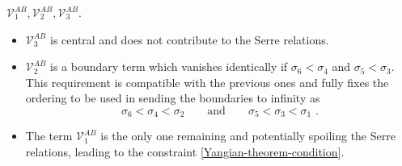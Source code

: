\documentclass[12pt]{article}
\numberwithin{equation}{section}
\begin{document}
\begin{itemize}
\begin{itemize}
$\mathcal{V}_{1}^{AB},\mathcal{V}_{2}^{AB},\mathcal{V}_{3}^{AB}$.
\begin{itemize}
\item $\mathcal{V}_{3}^{AB}$ is central and does not contribute to the Serre relations.
\item $\mathcal{V}_{2}^{AB}$ is a boundary term which vanishes identically if $\sigma_{6}<\sigma_{4}$ and $\sigma_{5}<\sigma_{3}$. This requirement is compatible with the previous ones and fully fixes the ordering to be used in sending the boundaries to infinity as
\begin{equation}
\sigma_{6} <\sigma_{4}<\sigma_{2}
\qquad \text{and} \qquad 
\sigma_{5} <\sigma_{3}<\sigma_{1} \,\, .
\end{equation}
\item The term $\mathcal{V}_{1}^{AB}$ is the only one remaining and potentially spoiling the Serre relations, leading to the constraint \eqref{Yangian-theorem-condition}.
\end{itemize}
\end{itemize}
\end{itemize}
\end{document}
